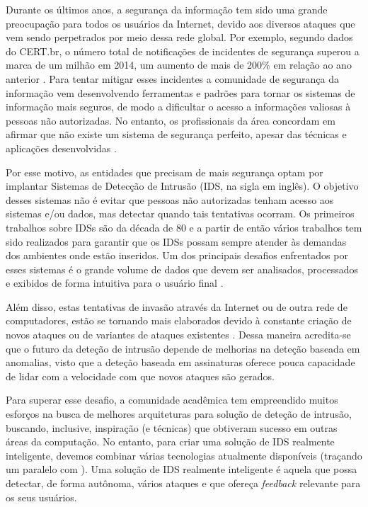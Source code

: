 \documentclass[
	12pt,				%
	openright,			%
	twoside,			%
	a4paper,			%
	english,			%
	spanish,			%
	brazil,				%
	]{abntex2}
\begin{document}
Durante os últimos anos, a segurança da informação tem sido uma grande preocupação para todos os usuários da Internet, devido aos diversos ataques que vem sendo perpetrados por meio dessa rede global. Por exemplo, segundo dados do CERT.br, o número total de notificações de incidentes de segurança superou a marca de um milhão em 2014, um aumento de mais de 200\% em relação ao ano anterior \cite{incidentes2015incidentes}. Para tentar mitigar esses incidentes a comunidade de segurança da informação vem desenvolvendo ferramentas e padrões para tornar os sistemas de informação mais seguros, de modo a dificultar o acesso a informações valiosas à pessoas não autorizadas. No entanto, os profissionais da área concordam em afirmar que não existe um sistema de segurança perfeito, apesar das técnicas e aplicações desenvolvidas \cite{dua2011data}.

Por esse motivo, as entidades que precisam de mais segurança optam por implantar Sistemas de Detecção de Intrusão (IDS, na sigla em inglês). O objetivo desses sistemas não é evitar que pessoas não autorizadas tenham acesso aos sistemas e/ou dados, mas detectar quando tais tentativas ocorram. Os primeiros trabalhos sobre IDSs são da década de 80 \cite{anderson1980computer, denning1987intrusion} e a partir de então vários trabalhos tem sido realizados para garantir que os IDSs possam sempre atender às demandas dos ambientes onde estão inseridos. Um dos principais desafios enfrentados por esses sistemas é o grande volume de dados que devem ser analisados, processados e exibidos de forma intuitiva para o usuário final \cite{big2013big, nassar2013secure}.

Além disso, estas tentativas de invasão através da Internet ou de outra rede de computadores, estão se tornando mais elaborados devido à constante criação de novos ataques ou de variantes de ataques existentes \cite{zuech2015intrusion}. Dessa maneira acredita-se que o futuro da deteção de intrusão depende de melhorias na deteção baseada em anomalias, visto que a deteção baseada em assinaturas oferece pouca capacidade de lidar com a velocidade com que novos ataques são gerados.

Para superar esse desafio, a comunidade acadêmica tem empreendido muitos esforços na busca de melhores arquiteturas para solução de deteção de intrusão, buscando, inclusive, inspiração (e técnicas) que obtiveram sucesso em outras áreas da computação. No entanto, para criar uma solução de IDS realmente inteligente, devemos combinar várias tecnologias atualmente disponíveis (traçando um paralelo com \cite{schales2011stream}). Uma solução de IDS realmente inteligente é aquela que possa detectar, de forma autônoma, vários ataques e que ofereça \emph{feedback} relevante para os seus usuários.
\end{document}
